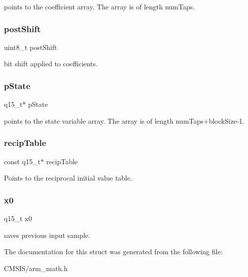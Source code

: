 points to the coefficient array. The array is of length num\+Taps. \mbox{\label{structarm__lms__norm__instance__q15_a74050e9f36542bd56f4052381a82ae8f}} 
\subsubsection{\texorpdfstring{postShift}{postShift}}
{\footnotesize\ttfamily uint8\+\_\+t post\+Shift}

bit shift applied to coefficients. \mbox{\label{structarm__lms__norm__instance__q15_ae29dfdb736374fcddaeaec4b7770170c}} 
\subsubsection{\texorpdfstring{pState}{pState}}
{\footnotesize\ttfamily q15\+\_\+t$\ast$ p\+State}

points to the state variable array. The array is of length num\+Taps+block\+Size-\/1. \mbox{\label{structarm__lms__norm__instance__q15_adb208045a3bf521f9522f574dc76dff3}} 
\subsubsection{\texorpdfstring{recipTable}{recipTable}}
{\footnotesize\ttfamily const q15\+\_\+t$\ast$ recip\+Table}

Points to the reciprocal initial value table. \mbox{\label{structarm__lms__norm__instance__q15_a3c975fed200b19723a2ed11efccca6cd}} 
\subsubsection{\texorpdfstring{x0}{x0}}
{\footnotesize\ttfamily q15\+\_\+t x0}

saves previous input sample. 

The documentation for this struct was generated from the following file\+:\begin{DoxyCompactItemize}
\item 
C\+M\+S\+I\+S/arm\+\_\+math.\+h\end{DoxyCompactItemize}
